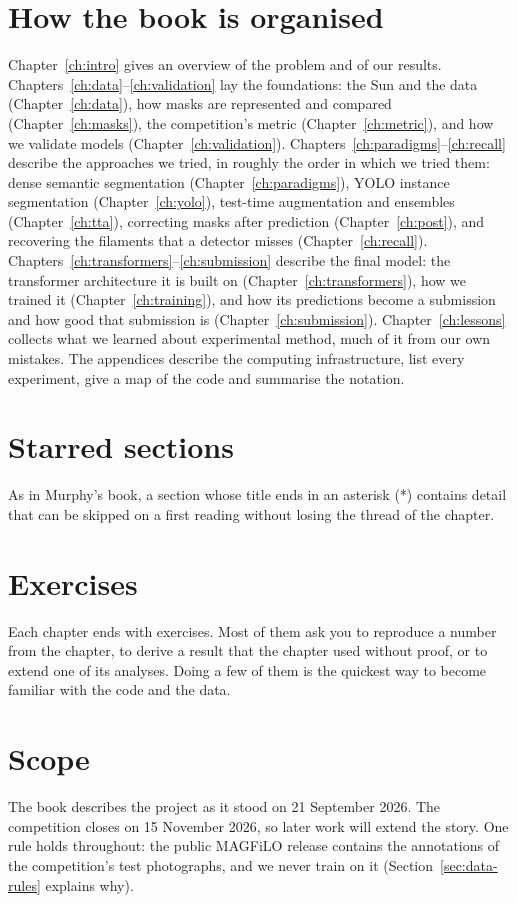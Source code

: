 \documentclass[11pt,oneside]{book}
\begin{document}
\section*{How the book is organised}
Chapter~\ref{ch:intro} gives an overview of the problem and of our results.
Chapters~\ref{ch:data}--\ref{ch:validation} lay the foundations: the Sun and the data
(Chapter~\ref{ch:data}), how masks are represented and compared (Chapter~\ref{ch:masks}), the
competition's metric (Chapter~\ref{ch:metric}), and how we validate models
(Chapter~\ref{ch:validation}). Chapters~\ref{ch:paradigms}--\ref{ch:recall} describe the
approaches we tried, in roughly the order in which we tried them: dense semantic segmentation
(Chapter~\ref{ch:paradigms}), YOLO instance segmentation (Chapter~\ref{ch:yolo}), test-time
augmentation and ensembles (Chapter~\ref{ch:tta}), correcting masks after prediction
(Chapter~\ref{ch:post}), and recovering the filaments that a detector misses
(Chapter~\ref{ch:recall}). Chapters~\ref{ch:transformers}--\ref{ch:submission} describe the
final model: the transformer architecture it is built on (Chapter~\ref{ch:transformers}), how
we trained it (Chapter~\ref{ch:training}), and how its predictions become a submission and how
good that submission is (Chapter~\ref{ch:submission}). Chapter~\ref{ch:lessons} collects what we
learned about experimental method, much of it from our own mistakes. The appendices describe the
computing infrastructure, list every experiment, give a map of the code and summarise the
notation.

\section*{Starred sections}
As in Murphy's book, a section whose title ends in an asterisk (*) contains detail that can be
skipped on a first reading without losing the thread of the chapter.

\section*{Exercises}
Each chapter ends with exercises. Most of them ask you to reproduce a number from the chapter,
to derive a result that the chapter used without proof, or to extend one of its analyses. Doing
a few of them is the quickest way to become familiar with the code and the data.

\section*{Scope}
The book describes the project as it stood on 21 September 2026. The competition closes on
15 November 2026, so later work will extend the story. One rule holds throughout: the public
MAGFiLO release contains the annotations of the competition's test photographs, and we never
train on it (Section~\ref{sec:data-rules} explains why).
\end{document}
